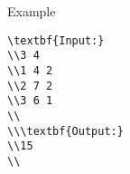 Example
\begin{verbatim}
\textbf{Input:}
\\3 4
\\1 4 2
\\2 7 2
\\3 6 1
\\
\\\textbf{Output:}
\\15
\\\end{verbatim}